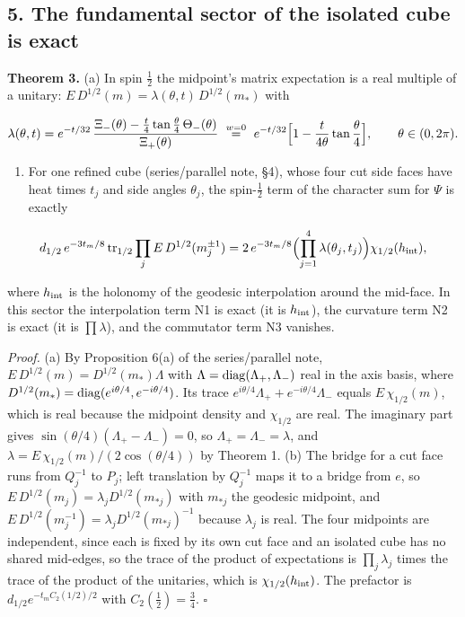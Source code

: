 \documentclass[11pt,a4paper]{article}
\newcommand{\tightlist}{\setlength{\itemsep}{0pt}\setlength{\parskip}{0pt}}
\begin{document}
\hypertarget{the-fundamental-sector-of-the-isolated-cube-is-exact}{%
\subsection{5. The fundamental sector of the isolated cube is
exact}\label{the-fundamental-sector-of-the-isolated-cube-is-exact}}

\textbf{Theorem 3.} (a) In spin \(\frac12\) the midpoint's matrix
expectation is a real multiple of a unitary:
\(E\,D^{1/2}(m)=\lambda(\theta,t)\,D^{1/2}(m_*)\) with

\[\lambda(\theta,t)=e^{-t/32}\,\frac{\Xi_-(\theta)-\frac t4\tan\frac\theta4\,\Theta_-(\theta)}{\Xi_+(\theta)}
\ \overset{w=0}{=}\ e^{-t/32}\Bigl[1-\frac t{4\theta}\tan\frac\theta4\Bigr],
\qquad\theta\in(0,2\pi).\]

\begin{enumerate}
\def\labelenumi{(\alph{enumi})}
\setcounter{enumi}{1}
\tightlist
\item
  For one refined cube (series/parallel note, §4), whose four cut side
  faces have heat times \(t_j\) and side angles \(\theta_j\), the
  spin-\(\frac12\) term of the character sum for \(\Psi\) is exactly
\end{enumerate}

\[d_{1/2}\,e^{-3t_m/8}\,{\rm tr}_{1/2}\prod_jE\,D^{1/2}(m_j^{\pm1})
=2\,e^{-3t_m/8}\Bigl(\prod_{j=1}^4\lambda(\theta_j,t_j)\Bigr)\chi_{1/2}(h_{\rm int}),\]

where \(h_{\rm int}\) is the holonomy of the geodesic interpolation
around the mid-face. In this sector the interpolation term N1 is exact
(it is \(h_{\rm int}\)), the curvature term N2 is exact (it is
\(\prod\lambda\)), and the commutator term N3 vanishes.

\emph{Proof.} (a) By Proposition 6(a) of the series/parallel note,
\(E\,D^{1/2}(m)=D^{1/2}(m_*)\Lambda\) with
\(\Lambda={\rm diag}(\Lambda_+,\Lambda_-)\) real in the axis basis,
where \(D^{1/2}(m_*)={\rm diag}(e^{i\theta/4},e^{-i\theta/4})\). Its
trace \(e^{i\theta/4}\Lambda_++e^{-i\theta/4}\Lambda_-\) equals
\(E\,\chi_{1/2}(m)\), which is real because the midpoint density and
\(\chi_{1/2}\) are real. The imaginary part gives
\(\sin(\theta/4)(\Lambda_+-\Lambda_-)=0\), so
\(\Lambda_+=\Lambda_-=\lambda\), and
\(\lambda=E\,\chi_{1/2}(m)/(2\cos(\theta/4))\) by Theorem 1. (b) The
bridge for a cut face runs from \(Q_j^{-1}\) to \(P_j\); left
translation by \(Q_j^{-1}\) maps it to a bridge from \(e\), so
\(E\,D^{1/2}(m_j)=\lambda_jD^{1/2}(m_{*j})\) with \(m_{*j}\) the
geodesic midpoint, and
\(E\,D^{1/2}(m_j^{-1})=\lambda_jD^{1/2}(m_{*j})^{-1}\) because
\(\lambda_j\) is real. The four midpoints are independent, since each is
fixed by its own cut face and an isolated cube has no shared mid-edges,
so the trace of the product of expectations is \(\prod_j\lambda_j\)
times the trace of the product of the unitaries, which is
\(\chi_{1/2}(h_{\rm int})\). The prefactor is
\(d_{1/2}e^{-t_mC_2(1/2)/2}\) with \(C_2(\frac12)=\frac34\). \(\square\)
\end{document}

